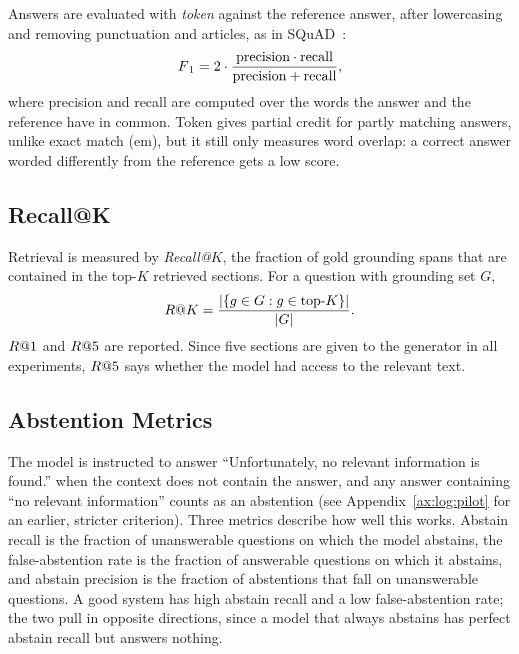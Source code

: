 Answers are evaluated with \emph{token \fone{}} against the reference answer, after
lowercasing and removing punctuation and articles, as in SQuAD~\cite{rajpurkar2016squad}:
\begin{equation}
    F\textsubscript{1} = 2 \cdot \frac{\text{precision} \cdot \text{recall}}
                         {\text{precision} + \text{recall}},
\end{equation}
where precision and recall are computed over the words the answer and the reference have
in common. Token \fone{} gives partial credit for partly matching answers, unlike exact
match (\gls{em}), but it still only measures word overlap: a correct answer worded
differently from the reference gets a low score.

\subsection{Recall@K}

Retrieval is measured by \emph{Recall@$K$}, the fraction of gold grounding spans that are
contained in the top-$K$ retrieved sections. For a question with grounding set $G$,
\begin{equation}
    R@K = \frac{|\{g \in G : g \in \text{top-}K\}|}{|G|}.
\end{equation}
$R@1$ and $R@5$ are reported. Since five sections are given to the generator in
all experiments, $R@5$ says whether the model had access to the relevant text.

\subsection{Abstention Metrics}

The model is instructed to answer ``Unfortunately, no relevant information is found.''
when the context does not contain the answer, and any answer containing ``no relevant
information'' counts as an abstention (see Appendix~\ref{ax:log:pilot} for an earlier,
stricter criterion). Three metrics describe how well this works. Abstain recall is the
fraction of unanswerable questions on which the model abstains, the false-abstention rate
is the fraction of answerable questions on which it abstains, and abstain precision is the
fraction of abstentions that fall on unanswerable questions. A good system has high
abstain recall and a low false-abstention rate; the two pull in opposite directions, since
a model that always abstains has perfect abstain recall but answers nothing.


